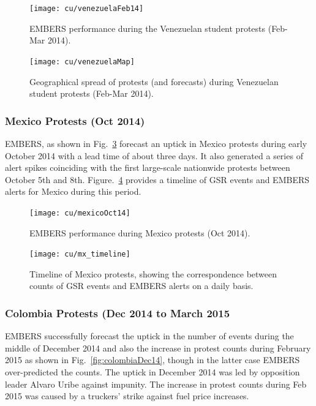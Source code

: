 \begin{figure}[H]
\centering
\texttt{[image: cu/venezuelaFeb14]}
\caption{EMBERS performance during the Venezuelan student protests (Feb-Mar 2014).}
\label{fig:venezuelaMarch14}
\end{figure}

\begin{figure}[H]
\centering
\texttt{[image: cu/venezuelaMap]}
\caption{Geographical spread of protests (and forecasts) during
Venezuelan student protests (Feb-Mar 2014).}
\label{fig:venezuelaMap}
\end{figure}

\subsubsection*{Mexico Protests (Oct 2014)}

EMBERS, as shown in Fig.~\ref{fig:mexicoOct14} forecast an uptick in Mexico
protests during early October 2014 with a lead time of about three days.
It also generated  a series of alert spikes coinciding with the first
large-scale nationwide protests between October 5th and 8th.
Figure.~\ref{fig:mexicoTimeline} provides a timeline of GSR events and
EMBERS alerts for Mexico during this period. 

\begin{figure}[H]
\centering
\texttt{[image: cu/mexicoOct14]}
\caption{EMBERS performance during Mexico protests (Oct 2014).}
\label{fig:mexicoOct14}
\end{figure}

\begin{figure}[H]
\centering
\texttt{[image: cu/mx\_timeline]}
\caption{Timeline of Mexico protests, showing the correspondence
between counts of GSR events and EMBERS alerts on a daily basis.}
\label{fig:mexicoTimeline}
\end{figure}

\subsubsection*{Colombia Protests (Dec 2014 to March 2015}

EMBERS successfully forecast the uptick in the number of events during the
middle of December 2014 and also the increase in protest counts
during February 2015 as shown in Fig.~\ref{fig:colombiaDec14}, though in the
latter case EMBERS over-predicted the counts. The uptick in
December 2014 was led by opposition leader Alvaro Uribe against impunity.
The increase in protest counts during Feb 2015 was
caused by a truckers' strike against fuel price increases.

